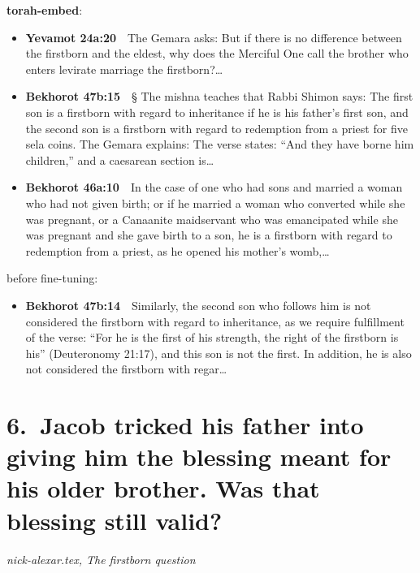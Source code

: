 \documentclass[11pt,a4paper]{article}
\begin{document}
{\color{quiet}\small\textbf{torah-embed}:}
\begin{itemize}[leftmargin=1.2em,itemsep=3pt]
\item {\color{ref}\textbf{Yevamot 24a:20}}\ \ The Gemara asks: But if there is no difference between the firstborn and the eldest, why does the Merciful One call the brother who enters levirate marriage the firstborn?\ldots
\item {\color{ref}\textbf{Bekhorot 47b:15}}\ \ § The mishna teaches that Rabbi Shimon says: The first son is a firstborn with regard to inheritance if he is his father’s first son, and the second son is a firstborn with regard to redemption from a priest for five sela coins. The Gemara explains: The verse states: “And they have borne him children,” and a caesarean section is\ldots
\item {\color{ref}\textbf{Bekhorot 46a:10}}\ \ In the case of one who had sons and married a woman who had not given birth; or if he married a woman who converted while she was pregnant, or a Canaanite maidservant who was emancipated while she was pregnant and she gave birth to a son, he is a firstborn with regard to redemption from a priest, as he opened his mother’s womb,\ldots
\end{itemize}
{\color{quiet}\small before fine-tuning:}
\begin{itemize}[leftmargin=1.2em]
\item {\color{ref}\textbf{Bekhorot 47b:14}}\ \ Similarly, the second son who follows him is not considered the firstborn with regard to inheritance, as we require fulfillment of the verse: “For he is the first of his strength, the right of the firstborn is his” (Deuteronomy 21:17), and this son is not the first. In addition, he is also not considered the firstborn with regar\ldots
\end{itemize}

\section*{6.\ Jacob tricked his father into giving him the blessing meant for his older brother. Was that blessing still valid?}
{\color{quiet}\small\textit{nick-alexar.tex, The firstborn question}}
\end{document}
